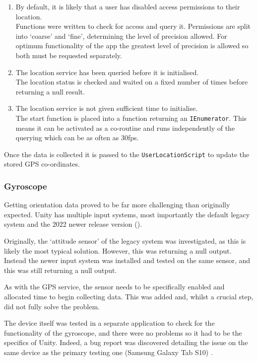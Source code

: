 \documentclass[12pt, a4paper]{article}
\begin{document}
\begin{enumerate}
    \item By default, it is likely that a user has disabled access permissions to their location. \\ Functions were written to check for access and query it. Permissions are split into `coarse' and `fine', determining the level of precision allowed. For optimum functionality of the app the greatest level of precision is allowed so both must be requested separately.
    \item The location service has been queried before it is initialised. \\ The location status is checked and waited on a fixed number of times before returning a null result.
    \item The location service is not given sufficient time to initialise. \\ The start function is placed into a function returning an \verb|IEnumerator|. This means it can be activated as a co-routine and runs independently of the querying which can be as often as 30fps.
\end{enumerate}

Once the data is collected it is passed to the \verb|UserLocationScript| to update the stored GPS co-ordinates.

\subsubsection{Gyroscope}
Getting orientation data proved to be far more challenging than originally expected. Unity has multiple input systems, most importantly the default legacy system and the 2022 newer release version (\cite{movement:newinputsystem}). 

Originally, the `attitude sensor' of the legacy system was investigated, as this is likely the most typical solution. However, this was returning a null output. Instead the newer input system was installed and tested on the same sensor, and this was still returning a null output. 

As with the GPS service, the sensor needs to be specifically enabled and allocated time to begin collecting data. This was added and, whilst a crucial step, did not fully solve the problem.

The device itself was tested in a separate application to check for the functionality of the gyroscope, and there were no problems so it had to be the specifics of Unity. Indeed, a bug report was discovered detailing the issue on the same device as the primary testing one (Samsung Galaxy Tab S10) \cite{movement:gyroissue}. 
\end{document}
